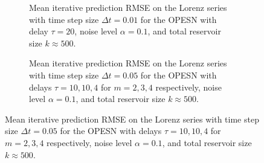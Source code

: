 \begin{figure}
    \centering

    \begin{subfigure}{\textwidth}
        \caption{Mean iterative prediction RMSE on the Lorenz series with time step size $\Delta t=0.01$ for the OPESN with delay $\tau=20$, noise level $\alpha=0.1$, and total reservoir size $k\approx500$.}
        \label{fig:OPESN_iterative_0_01}
        \centering
    \end{subfigure}

    \vspace{0.5em}

    \begin{subfigure}{\textwidth}
        \caption{Mean iterative prediction RMSE on the Lorenz series with time step size $\Delta t=0.05$ for the OPESN with delays $\tau=10,10,4$ for $m=2,3,4$ respectively, noise level $\alpha=0.1$, and total reservoir size $k\approx500$.}
        \label{fig:OPESN_iterative_0_05}
        \centering
    \end{subfigure}


\end{figure}
